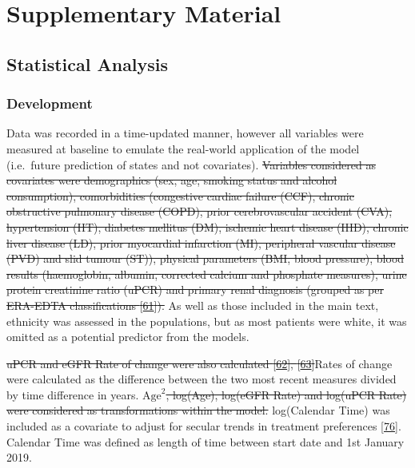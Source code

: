 \documentclass[
]{article}
\begin{document}
\hypertarget{appendix-appendices}{%
\appendix}


\hypertarget{chapdevpapersupp}{%
\section{Supplementary Material}\label{chapdevpapersupp}}

\hypertarget{statistical-analysis}{%
\subsection{Statistical Analysis}\label{statistical-analysis}}

\hypertarget{development-1}{%
\subsubsection{Development}\label{development-1}}

Data was recorded in a time-updated manner, however all variables were measured at baseline to emulate the real-world application of the model (i.e.~future prediction of states and not covariates). \sout{Variables considered as covariates were demographics (sex, age, smoking status and alcohol consumption), comorbidities (congestive cardiac failure (CCF), chronic obstructive pulmonary disease (COPD), prior cerebrovascular accident (CVA), hypertension (HT), diabetes mellitus (DM), ischemic heart disease (IHD), chronic liver disease (LD), prior myocardial infarction (MI), peripheral vascular disease (PVD) and slid tumour (ST)), physical parameters (BMI, blood pressure), blood results (haemoglobin, albumin, corrected calcium and phosphate measures), urine protein creatinine ratio (uPCR) and primary renal diagnosis (grouped as per ERA-EDTA classifications {[}\protect\hyperlink{ref-venkat-raman_new_2012}{61}{]}).} As well as those included in the main text, ethnicity was assessed in the populations, but as most patients were white, it was omitted as a potential predictor from the models.

\sout{uPCR and eGFR Rate of change were also calculated {[}\protect\hyperlink{ref-kovesdy_past_2016}{62}{]}, {[}\protect\hyperlink{ref-naimark_past_2016}{63}{]}}Rates of change were calculated as the difference between the two most recent measures divided by time difference in years. \sout{\(\textrm{Age}^2\), log(Age), log(eGFR Rate) and log(uPCR Rate) were considered as transformations within the model.} log(Calendar Time) was included as a covariate to adjust for secular trends in treatment preferences {[}\protect\hyperlink{ref-bhatnagar_epidemiology_2015}{76}{]}. Calendar Time was defined as length of time between start date and 1st January 2019.
\end{document}
